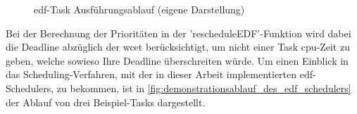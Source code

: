 \documentclass[../EDF Master Thesis.tex]{subfiles}
\begin{document}
    \begin{figure}[ht!]
        \begin{center}
        \end{center}
        \caption[\ac{edf}-Task Ausführungsablauf]{\ac{edf}-Task Ausführungsablauf (eigene Darstellung)}
        \label{fig:edf_task_ausfuehrungsablauf}
    \end{figure}

    \clearpage
    
    Bei der Berechnung der Prioritäten in der 'rescheduleEDF'-Funktion wird dabei die Deadline abzüglich der \ac{wcet} berücksichtigt, um nicht einer Task \ac{cpu}-Zeit zu geben, welche sowieso Ihre Deadline überschreiten würde.
    Um einen Einblick in das Scheduling-Verfahren, mit der in dieser Arbeit implementierten \ac{edf}-Schedulers, zu bekommen, ist in \autoref{fig:demonstrationsablauf_des_edf_schedulers} der Ablauf von drei Beispiel-Tasks dargestellt.
\end{document}
